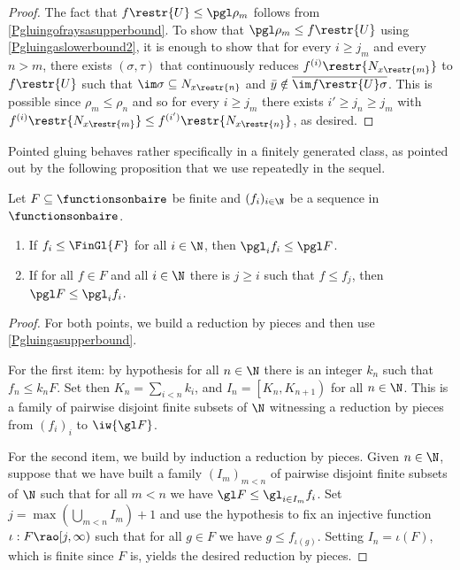 \begin{proof}
The fact that $f\restr{U}\leq \pgl \rho_m$ follows from \cref{Pgluingofraysasupperbound}. 
To show that $\pgl \rho_m \leq f\restr{U}$ using \cref{Pgluingaslowerbound2}, it is enough to show that for every $i\geq j_m$ and every $n>m$,
there exists $(\sigma,\tau)$ that continuously reduces $f^{(i)}\restr{N_{x\restr{m}}}$ to $f\restr{U}$ such that
$\im \sigma \subseteq N_{x\restr{n}}$ and $\bar{y}\notin \overline{\im f\restr{U} \sigma}$.
This is possible since $\rho_m\leq \rho_n$ and so for every $i\geq j_m$ there exists $i'\geq j_n\geq j_m$ with $f^{(i)}\restr{N_{x\restr{m}}}\leq f^{(i')}\restr{N_{x\restr{n}}}$, as desired.
\end{proof}



Pointed gluing behaves rather specifically in a finitely generated class, as pointed out by the following proposition that we use repeatedly in the sequel.


\begin{Proposition}\label{FinitegenerationandPgluing}
Let $F\subseteq \functionsonbaire$ be finite and $(f_i)_{i\in\N}$ be a sequence in $\functionsonbaire$.
\begin{enumerate}
\item If $f_i\leq\FinGl{F}$ for all $i\in\N$, then $\pgl_if_i\leq \pgl F$.
\item If for all $f\in F$ and all $i\in\N$ there is $j\geq i$ such that $f\leq f_j$, then $\pgl F\leq\pgl_if_i$.
\end{enumerate}
\end{Proposition}
\begin{proof}
For both points, we build a reduction by pieces and then use \cref{Pgluingasupperbound}.

For the first item: by hypothesis for all $n\in \N$ there is an integer $k_n$ such that $f_n\leq k_n F$. Set then $K_n=\sum_{i<n}k_i$, and $I_n=\left[K_{n}, K_{n+1}\right)$ for all $n\in\N$.
This is a family of pairwise disjoint finite subsets of $\N$ witnessing a reduction by pieces from $(f_i)_i$ to $\iw{\gl F}$.

For the second item, we build by induction a reduction by pieces.
Given $n\in\N$, suppose that we have built a family $(I_m)_{m<n}$ of pairwise disjoint finite subsets of $\N$ such that for all $m<n$ we have $\gl F\leq\gl_{i\in I_m}f_i$.
Set $j=\max(\bigcup_{m<n}I_m)+1$ and use the hypothesis to fix an injective function $\iota:F\rao[j,\infty)$ such that for all $g\in F$ we have $g\leq f_{\iota(g)}$.
Setting $I_n=\iota(F)$, which is finite since $F$ is, yields the desired reduction by pieces. %
\end{proof}

